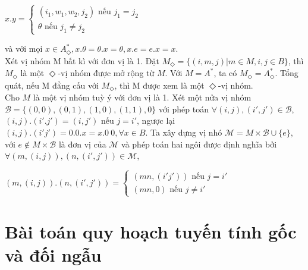 $x.y= \begin{cases}
    (i_1, w_1, w_2, j_2) \text{ nếu     } j_1 = j_2\\
    \theta \text{       nếu         } j_1 \ne j_2
\end{cases}
$
\begin{flushleft}
\hspace{20mm}và với mọi $x \in A^*_\Diamond, x.\theta = \theta.x = \theta, x.e = e.x = x$.\\
\hspace{10mm}Xét vị nhóm M bất kì với đơn vị là 1. Đặt $M_\Diamond = \{ (i,m,j) | m \in M, i,j \in B \}$, thì $M_\Diamond$ là một $\Diamond$-vị nhóm được mở rộng từ $M$. Với $M = A^*$, ta có $M_\Diamond = A^*_\Diamond$. Tổng quát, nếu M đẳng cấu với $M_\Diamond$, thì M được xem là một $\Diamond$-vị nhóm.\\
\hspace{10mm}Cho $M$ là một vị nhóm tuỳ ý với đơn vị là 1. Xét một nửa vị nhóm $\mathcal{B} = \{ (0,0),(0,1),(1,0),(1,1),0 \}$ với phép toán $\forall (i,j),(i',j') \in \mathcal{B}$, $(i,j).(i'.j') = (i,j')$ nếu $j = i'$, ngược lại $(i,j).(i'j') = 0. 0.x = x.0 \ 0, \forall x \in B$. Ta xây dựng vị nhó $\mathcal{M}= M \times \mathcal{B} \cup \{e\}$, với $e \not\in M \times \mathcal{B}$ là đơn vị của $\mathcal{M}$ và phép toán hai ngôi được định nghĩa bởi $\forall (m,(i,j)), (n,(i',j')) \in \mathcal{M}$,
\end{flushleft}
$
    (m,(i,j)).(n,(i',j')) = \begin{cases}
        (mn, (i'j')) \text{     nếu     } j = i'\\
        (mn, 0) \text{  nếu     }  j \ne i'
    \end{cases}
$
\section{Bài toán quy hoạch tuyến tính gốc và đối ngẫu}
